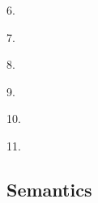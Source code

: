\documentclass[a4paper,11pt]{article}
\begin{document}
\begin{description}
\item{6.}

\item{7.}

\item{8.}

\item{9.}

\item{10.}

\item{11.}


\end{description}


\subsection{Semantics}
\end{document}
